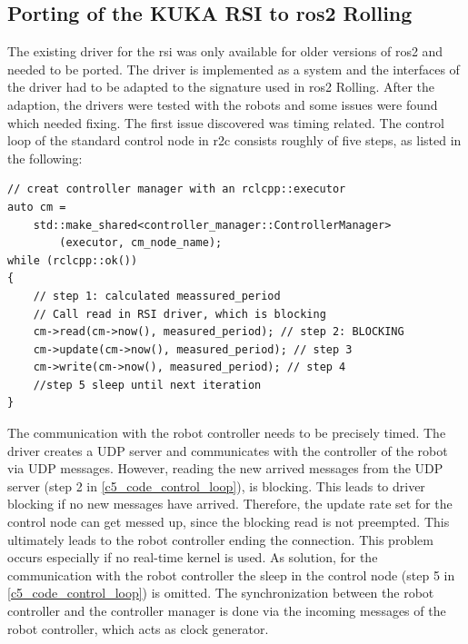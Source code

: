 \subsection{Porting of the KUKA RSI to \gls{ros2} Rolling}
The existing driver for the \gls{rsi} was only available for older versions of \gls{ros2} and needed to be ported. 
The driver is implemented as a system and the interfaces of the driver had to be adapted to the signature used in \gls{ros2} Rolling. After the adaption, the drivers were tested with the robots and some issues were found which needed fixing.\newline 
The first issue discovered was timing related. The control loop of the standard control node in \gls{r2c} consists roughly of five steps, as listed in the following:\newline
\lstset{language=C++,basicstyle=\small}
\begin{lstlisting}[caption=Pseudo code for the control loop.,label=c5_code_control_loop]
// creat controller manager with an rclcpp::executor
auto cm = 
    std::make_shared<controller_manager::ControllerManager>
        (executor, cm_node_name);
while (rclcpp::ok())
{   
    // step 1: calculated meassured_period
    // Call read in RSI driver, which is blocking
    cm->read(cm->now(), measured_period); // step 2: BLOCKING 
    cm->update(cm->now(), measured_period); // step 3
    cm->write(cm->now(), measured_period); // step 4
    //step 5 sleep until next iteration
}
\end{lstlisting}
The communication with the robot controller needs to be precisely timed. The driver creates a UDP server and communicates with the controller of the robot via UDP messages. However, reading the new arrived messages from the UDP server (step 2 in \autoref{c5_code_control_loop}), is blocking. This leads to driver blocking if no new messages have arrived. Therefore, the update rate set for the control node can get messed up, since the blocking read is not preempted. This ultimately leads to the robot controller ending the connection. This problem occurs especially if no real-time kernel is used.\newline
As solution, for the communication with the robot controller the sleep in the control node (step 5 in \autoref{c5_code_control_loop}) is omitted. The synchronization between the robot controller and the controller manager is done via the incoming messages of the robot controller, which acts as clock generator.

